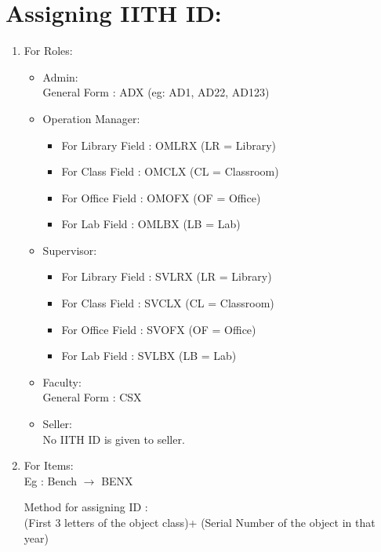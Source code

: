 \documentclass[12pt,a4paper]{article}
\begin{document}
    \section*{Assigning IITH ID:}
    \begin{enumerate}
    \item For Roles:
    \begin{itemize}
    \item Admin:\\ [5pt]
    General Form : ADX (eg: AD1, AD22, AD123)
    
    \item Operation Manager:
    \begin{itemize}
    \item For Library Field : OMLRX (LR = Library)
    \item For Class Field   : OMCLX (CL = Classroom)
    \item For Office Field  : OMOFX (OF = Office)
    \item For Lab Field     : OMLBX (LB = Lab) 
    \end{itemize}
    
    \item Supervisor:
    \begin{itemize}
    \item For Library Field : SVLRX (LR = Library)
    \item For Class Field   : SVCLX (CL = Classroom)
    \item For Office Field  : SVOFX (OF = Office)
    \item For Lab Field     : SVLBX (LB = Lab)
    \end{itemize}
    
    \item Faculty:\\[5pt]
    General Form : CSX 
    
    \item Seller: \\
    No IITH ID is given to seller.     
    \end{itemize}
 
 	\item For Items:   \\[10 pt]
	Eg : Bench $\longrightarrow$ BENX 

Method for assigning ID :\\[5 pt]
(First 3 letters of the object class)+ (Serial Number of the object in that year)
    
    \end{enumerate}
\end{document}

